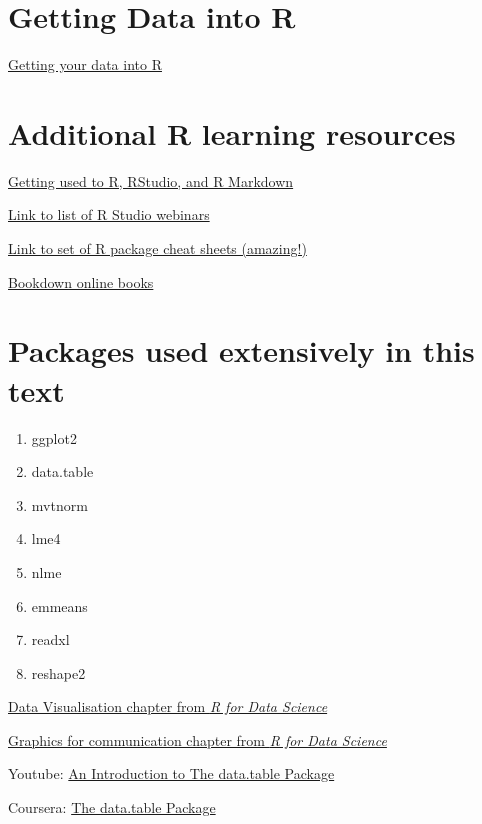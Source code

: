 \documentclass[]{book}
\providecommand{\tightlist}{%
  \setlength{\itemsep}{0pt}\setlength{\parskip}{0pt}}
\theoremstyle{definition}
\theoremstyle{definition}
\theoremstyle{definition}
\theoremstyle{remark}
\begin{document}
\section{Getting Data into R}\label{getting-data-into-r}

\href{https://www.rstudio.com/resources/webinars/getting-your-data-into-r/}{Getting
your data into R}

\section{Additional R learning
resources}\label{additional-r-learning-resources}

\href{https://bookdown.org/chesterismay/rbasics/}{Getting used to R,
RStudio, and R Markdown}

\href{https://www.rstudio.com/resources/webinars/}{Link to list of R
Studio webinars}

\href{https://www.rstudio.com/resources/cheatsheets/}{Link to set of R
package cheat sheets (amazing!)}

\href{https://bookdown.org}{Bookdown online books}

\section{Packages used extensively in this
text}\label{packages-used-extensively-in-this-text}

\begin{enumerate}
\def\labelenumi{\arabic{enumi}.}
\tightlist
\item
  ggplot2
\item
  data.table
\item
  mvtnorm
\item
  lme4
\item
  nlme
\item
  emmeans
\item
  readxl
\item
  reshape2
\end{enumerate}

\href{http://r4ds.had.co.nz/data-visualisation.html}{Data Visualisation
chapter from \emph{R for Data Science}}

\href{http://r4ds.had.co.nz/graphics-for-communication.html}{Graphics
for communication chapter from \emph{R for Data Science}}

Youtube: \href{https://www.youtube.com/watch?v=pc1ARG6kbAM}{An
Introduction to The data.table Package}

Coursera:
\href{https://www.coursera.org/learn/data-cleaning/lecture/trMZ7/the-data-table-package}{The
data.table Package}
\end{document}
